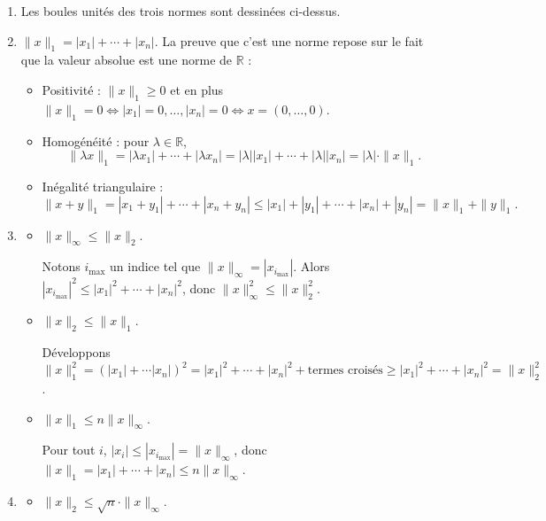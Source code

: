 \documentclass[11pt,a4paper]{article}
\newcommand{\Rr}{\mathbb{R}} \newcommand{\R}{\mathbb{R}}
\renewcommand{\ge}{\geqslant} \renewcommand{\geq}{\geqslant}
\renewcommand{\le}{\leqslant} \renewcommand{\leq}{\leqslant}
\theoremstyle{exostyle}
\begin{document}
\begin{enumerate}
	\item Les boules unités des trois normes sont dessinées ci-dessus.
	

	
	\item $ \|x\|_{1} = |x_1|+\cdots+|x_n|$.
	La preuve que c'est une norme repose sur le fait que la valeur absolue est une norme de $\Rr$ :
	\begin{itemize}
		\item Positivité : $\|x\|_1 \ge0$ et en plus $\|x\|_1 = 0 \iff |x_1|=0,\ldots,|x_n|=0 \iff x = (0,\ldots,0)$.
		
		\item Homogénéité : pour $\lambda \in \Rr$, 
		\[
		\| \lambda x \|_1 
		= |\lambda x_1|+\cdots+|\lambda x_n|
		= |\lambda| |x_1| + \cdots+|\lambda| |x_n| =  |\lambda| \cdot \| x \|_1.
		\]
		
		\item Inégalité triangulaire :
	\[
	\| x + y \|_1 
	= |x_1+y_1|+\cdots+|x_n+y_n| \le |x_1|+|y_1| + \cdots + |x_n|+|y_n| 
	= \| x\|_1 + \| y\|_1.
	\]
	\end{itemize}
	
	\item 
	\begin{itemize}
		\item $\|x\|_{\infty} \leq \|x\|_{2}$.
		
		Notons $i_{\max}$ un indice tel que $\|x\|_{\infty} = |x_{i_{\max}}|$.
		Alors $|x_{i_{\max}}|^2 \le |x_1|^2+\cdots+|x_n|^2$, donc 
		$\|x\|_{\infty}^2 \leq \|x\|_{2}^2$.
		
		\item $\|x\|_{2} \leq \|x\|_{1}$.
		
		Développons $\|x\|_{1}^2 = (|x_1| + \cdots |x_n|)^2 = |x_1|^2+\cdots+|x_n|^2 + \text{termes croisés} 
		\ge |x_1|^2+\cdots+|x_n|^2 = \| x \|_ 2^2$. 
		
		\item $\|x\|_{1} \leq n \|x\|_{\infty}$.
		
		Pour tout $i$, $|x_i| \le |x_{i_{\max}}| = \|x\|_{\infty}$,
donc $\|x\|_{1} = |x_1|+\cdots+|x_n| \le n	\|x\|_{\infty}$.	
	\end{itemize}
				
	
	
	\item 
		\begin{itemize}
		\item $\|x\|_{2} \leq \sqrt{n} \cdot \|x\|_{\infty}$.
		

\end{itemize}
\end{enumerate}
\end{document}
